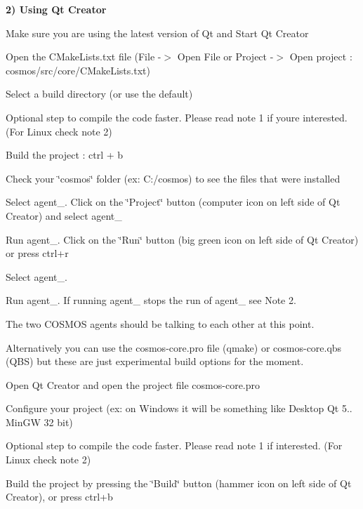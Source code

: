 {\bfseries 2) Using Qt Creator}


\begin{DoxyItemize}
\item Make sure you are using the latest version of Qt and Start Qt Creator
\item Open the C\+Make\+Lists.\+txt file (File -\/$>$ Open File or Project -\/$>$ Open project \+: cosmos/src/core/\+C\+Make\+Lists.\+txt)
\item Select a build directory (or use the default)
\item Optional step to compile the code faster. Please read note 1 if you\textquotesingle{}re interested. (For Linux check note 2)
\item Build the project \+: ctrl + b
\item Check your \char`\"{}cosmos\char`\"{} folder (ex\+: C\+:/cosmos) to see the files that were installed
\item Select agent\+\_. Click on the \char`\"{}\+Project\char`\"{} button (computer icon on left side of Qt Creator) and select agent\+\_
\item Run agent\+\_. Click on the \char`\"{}\+Run\char`\"{} button (big green icon on left side of Qt Creator) or press \textquotesingle{}ctrl+r\textquotesingle{}
\item Select agent\+\_.
\item Run agent\+\_. If running agent\+\_ stops the run of agent\+\_ see Note 2.
\end{DoxyItemize}

The two C\+O\+S\+M\+OS agents should be talking to each other at this point. 

Alternatively you can use the cosmos-\/core.\+pro file (qmake) or cosmos-\/core.\+qbs (Q\+BS) but these are just experimental build options for the moment.


\begin{DoxyItemize}
\item Open Qt Creator and open the project file \textquotesingle{}cosmos-\/core.\+pro\textquotesingle{}
\item Configure your project (ex\+: on Windows it will be something like \textquotesingle{}Desktop Qt 5.. Min\+GW 32 bit\textquotesingle{})
\item Optional step to compile the code faster. Please read note 1 if interested. (For Linux check note 2)
\item Build the project by pressing the \char`\"{}\+Build\char`\"{} button (hammer icon on left side of Qt Creator), or press \textquotesingle{}ctrl+b\textquotesingle{}
\end{DoxyItemize}

